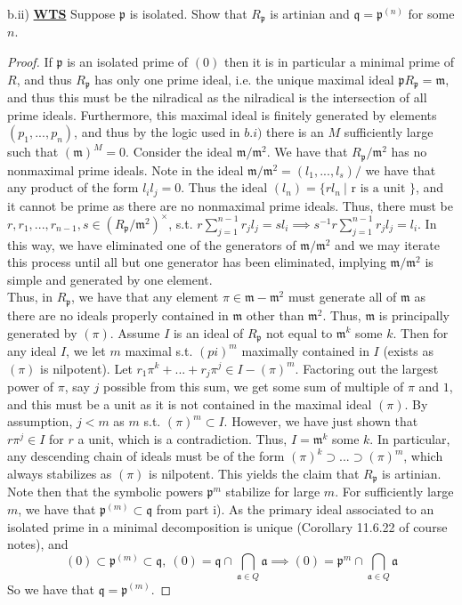 \documentclass{article}
\newcommand{\fk}[1]{\mathfrak{#1}}
\begin{document}
b.ii) \textbf{\underline{WTS}} Suppose $\fk{p}$ is isolated. Show that $R_{\fk{p}}$ is artinian and $\fk{q} = \fk{p}^{(n)}$ for some $n$.
\begin{proof}
  If $\fk{p}$ is an isolated prime of $(0)$ then it is in particular a minimal prime of $R$, and thus $R_{\fk{p}}$ has only one prime ideal, i.e. the unique maximal ideal $\fk{p}R_{\fk{p}} = \fk{m}$, and thus this must be the nilradical as the nilradical is the intersection of all prime ideals. Furthermore, this maximal ideal is finitely generated by elements $(p_{1},...,p_{n})$, and thus by the logic used in $b.i)$ there is an $M$ sufficiently large such that $(\fk{m})^{M} = 0$. Consider the ideal $\fk{m}/\fk{m}^{2}$. We have that $R_{\fk{p}}/\fk{m}^{2}$ has no nonmaximal prime ideals. Note in the ideal $\fk{m}/\fk{m}^{2} = (l_{1},...,l_{s})/$ we have that any product of the form $l_{i}l_{j} = 0$. Thus the ideal $(l_{n}) = \{rl_{n} \ |  \text{ r is a unit }\}$, and it cannot be prime as there are no nonmaximal prime ideals. Thus, there must be $r,r_{1},...,r_{n-1},s  \in (R_{\fk{p}}/\fk{m}^{2})^{\times}$, s.t. $r\sum_{j=1}^{n-1}r_{j}l_{j} = sl_{i} \implies s^{-1}r\sum_{j=1}^{n-1}r_{j}l_{j} = l_{i}$. In this way, we have eliminated one of the generators of $\fk{m}/\fk{m}^{2}$ and we may iterate this process until all but one generator has been eliminated, implying $\fk{m}/\fk{m}^{2}$ is simple and generated by one element. \\

  Thus, in $R_{\fk{p}}$, we have that any element $\pi \in \fk{m} - \fk{m}^{2}$ must generate all of $\fk{m}$ as there are no ideals properly contained in $\fk{m}$ other than $\fk{m}^{2}$. Thus, $\fk{m}$ is principally generated by $(\pi)$. Assume $I$ is an ideal of $R_{\fk{p}}$ not equal to $\fk{m}^{k}$ some $k$. Then for any ideal $I$, we let $m$ maximal s.t. $(pi)^{m}$ maximally contained in $I$ (exists as $(\pi)$ is nilpotent). Let $r_{1}\pi^{k}+...+r_{j}\pi^{j} \in I - (\pi)^{m}$. Factoring out the largest power of $\pi$, say $j$ possible from this sum, we get some sum of multiple of $\pi$ and $1$, and this must be a unit as it is not contained in the maximal ideal $(\pi)$. By assumption, $j<m$ as $m$ s.t. $(\pi)^{m} \subset I$. However, we have just shown that $r\pi^{j} \in I$ for $r$ a unit, which is a contradiction. Thus, $I = \fk{m}^{k}$ some $k$. In particular, any descending chain of ideals must be of the form $(\pi)^{k} \supset ... \supset (\pi)^{m}$, which always stabilizes as $(\pi)$ is nilpotent. This yields the claim that $R_{\fk{p}}$ is artinian. \\

  Note then that the symbolic powers $\fk{p}^{m}$ stabilize for large $m$. For sufficiently large $m$, we have that $\fk{p}^{(m)} \subset \fk{q}$ from part i). As the primary ideal associated to an isolated prime in a minimal decomposition is unique (Corollary 11.6.22 of course notes), and \[(0) \subset \fk{p}^{(m)} \subset \fk{q}, \  (0) = \fk{q} \cap \bigcap_{\fk{a} \in Q}\fk{a} \implies (0) = \fk{p}^{m} \cap \bigcap_{\fk{a} \in Q}\fk{a}\] So we have that $\fk{q} = \fk{p}^{(m)}$.
\end{proof}
\end{document}

